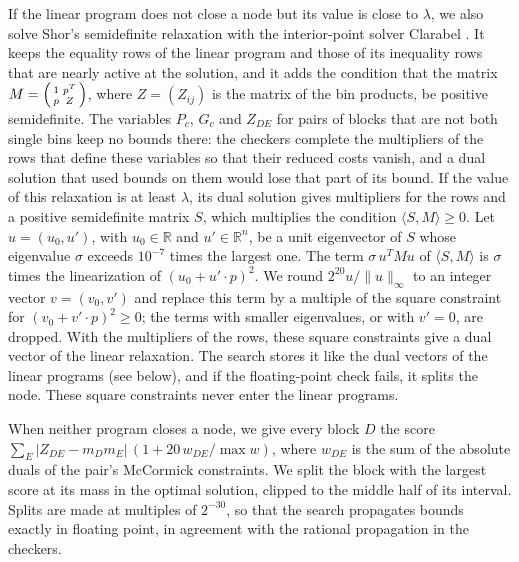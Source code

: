 \documentclass[11pt]{amsart}
\theoremstyle{definition}
\theoremstyle{remark}
\numberwithin{equation}{section}
\newcommand{\R}{\mathbb{R}}
\begin{document}
If the linear program does not close a node but its value is close to $\lambda$, we also solve Shor's semidefinite relaxation \cite{Sho87} with the interior-point solver Clarabel \cite{GC24}. It keeps the equality rows of the linear program and those of its inequality rows that are nearly active at the solution, and it adds the condition that the matrix $M=\begin{psmallmatrix}1&p^{T}\\p&Z\end{psmallmatrix}$, where $Z=(Z_{ij})$ is the matrix of the bin products, be positive semidefinite. The variables $P_c$, $G_c$ and $Z_{DE}$ for pairs of blocks that are not both single bins keep no bounds there: the checkers complete the multipliers of the rows that define these variables so that their reduced costs vanish, and a dual solution that used bounds on them would lose that part of its bound. If the value of this relaxation is at least $\lambda$, its dual solution gives multipliers for the rows and a positive semidefinite matrix $S$, which multiplies the condition $\langle S,M\rangle\ge0$. Let $u=(u_0,u')$, with $u_0\in\R$ and $u'\in\R^n$, be a unit eigenvector of $S$ whose eigenvalue $\sigma$ exceeds $10^{-7}$ times the largest one. The term $\sigma\,u^{T}Mu$ of $\langle S,M\rangle$ is $\sigma$ times the linearization of $(u_0+u'\cdot p)^2$. We round $2^{20}u/\|u\|_\infty$ to an integer vector $v=(v_0,v')$ and replace this term by a multiple of the square constraint for $(v_0+v'\cdot p)^2\ge0$; the terms with smaller eigenvalues, or with $v'=0$, are dropped. With the multipliers of the rows, these square constraints give a dual vector of the linear relaxation. The search stores it like the dual vectors of the linear programs (see below), and if the floating-point check fails, it splits the node. These square constraints never enter the linear programs.

When neither program closes a node, we give every block $D$ the score $\sum_E|Z_{DE}-m_Dm_E|\,(1+20\,w_{DE}/\max w)$, where $w_{DE}$ is the sum of the absolute duals of the pair's McCormick constraints. We split the block with the largest score at its mass in the optimal solution, clipped to the middle half of its interval. Splits are made at multiples of $2^{-30}$, so that the search propagates bounds exactly in floating point, in agreement with the rational propagation in the checkers.
\end{document}
